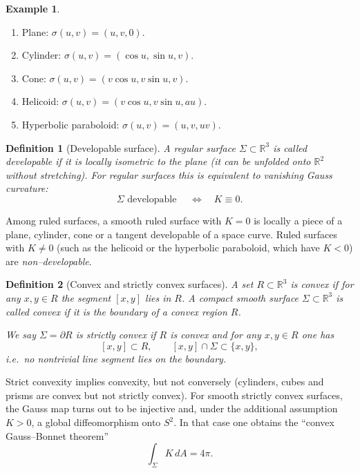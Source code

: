 \documentclass[12pt,a4paper]{article}
\theoremstyle{plain}
\newtheorem{definition}{Definition}
\theoremstyle{definition}      %
\newtheorem{example}[theorem]{Example}
\begin{document}
\begin{example}
	\leavevmode
	\begin{enumerate}
		\item Plane: $\sigma(u,v)=(u,v,0)$.
		\item Cylinder: $\sigma(u,v)=(\cos u,\sin u,v)$.
		\item Cone: $\sigma(u,v)=(v\cos u,v\sin u,v)$.
		\item Helicoid: $\sigma(u,v)=(v\cos u,v\sin u,au)$.
		\item Hyperbolic paraboloid: $\sigma(u,v)=(u,v,uv)$.
	\end{enumerate}
\end{example}

\begin{definition}[Developable surface]
	A regular surface $\Sigma\subset\mathbb{R}^3$ is called
	\emph{developable} if it is locally isometric to the plane (it can be
	unfolded onto $\mathbb{R}^2$ without stretching).  For regular surfaces
	this is equivalent to vanishing Gauss curvature:
	\[
	\Sigma \text{ developable } \quad\Longleftrightarrow\quad K\equiv0.
	\]
\end{definition}

Among ruled surfaces, a smooth ruled surface with $K=0$ is locally a
piece of a plane, cylinder, cone or a tangent developable of a space
curve.  Ruled surfaces with $K\neq0$ (such as the helicoid or the
hyperbolic paraboloid, which have $K<0$) are \emph{non--developable}.

\begin{definition}[Convex and strictly convex surfaces]
	A set $R\subset\mathbb{R}^3$ is \emph{convex} if for any $x,y\in R$ the
	segment $[x,y]$ lies in $R$.  A compact smooth surface
	$\Sigma\subset\mathbb{R}^3$ is called \emph{convex} if it is the
	boundary of a convex region $R$.
	
	We say $\Sigma=\partial R$ is \emph{strictly convex} if $R$ is convex
	and for any $x,y\in R$ one has
	\[
	[x,y]\subset R,\qquad [x,y]\cap\Sigma\subset\{x,y\},
	\]
	i.e.\ no nontrivial line segment lies on the boundary.
\end{definition}

Strict convexity implies convexity, but not conversely (cylinders,
cubes and prisms are convex but not strictly convex).  For smooth
strictly convex surfaces, the Gauss map turns out to be injective and,
under the additional assumption $K>0$, a global diffeomorphism onto
$S^2$.  In that case one obtains the ``convex Gauss--Bonnet theorem''
\[
\int_\Sigma K\,dA = 4\pi.
\]
\end{document}
